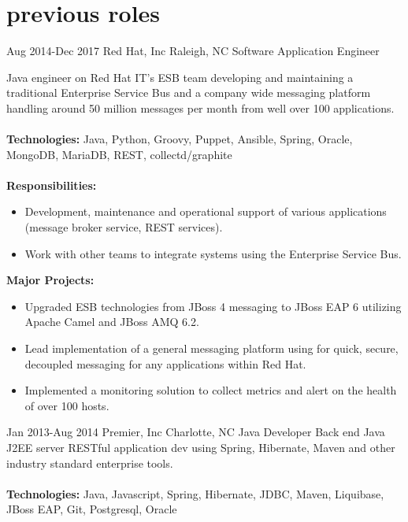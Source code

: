 
\section{previous roles}

\begin{entrylist}


\workentry
{Aug 2014-Dec 2017}
{Red Hat, Inc}
{Raleigh, NC}
{Software Application Engineer}
{Java engineer on Red Hat IT's ESB team developing and maintaining a traditional Enterprise Service Bus and a company wide messaging platform handling around 50 million messages per month from well over 100 applications. \\
\\
\textbf{Technologies:} Java, Python, Groovy, Puppet, Ansible, Spring, Oracle, MongoDB, MariaDB, REST, collectd/graphite \\
\\
\textbf{Responsibilities:}
\begin{itemize}
\item Development, maintenance and operational support of various applications (message broker service, REST services).
\item Work with other teams to integrate systems using the Enterprise Service Bus.
\end{itemize}
\textbf{Major Projects:}
\begin{itemize}
\item Upgraded ESB technologies from JBoss 4 messaging to JBoss EAP 6 utilizing Apache Camel and JBoss AMQ 6.2.
\item Lead implementation of a general messaging platform using for quick, secure, decoupled messaging for any applications within Red Hat.
\item Implemented a monitoring solution to collect metrics and alert on the health of over 100 hosts.
\end{itemize}}

\workentry
{Jan 2013-Aug 2014}
{Premier, Inc}
{Charlotte, NC}
{Java Developer}
{Back end Java J2EE server RESTful application dev using Spring, Hibernate, Maven and other industry standard enterprise tools. \\
\\
\textbf{Technologies:} Java, Javascript, Spring, Hibernate, JDBC, Maven, Liquibase, JBoss EAP, Git, Postgresql, Oracle}


\end{entrylist}
